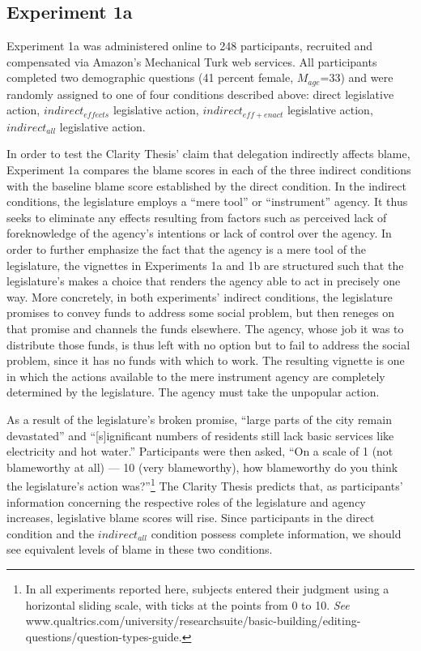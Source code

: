 \documentclass{article}
\begin{document}
\subsection{Experiment 1a}

Experiment 1a was administered online to 248 participants, recruited and compensated via Amazon's Mechanical Turk web services. All participants completed two demographic questions (41 percent female, $M_{age}$=33) and were randomly assigned to one of four conditions described above: direct legislative action, $indirect_{effects}$ legislative action, $indirect_{eff+enact}$ legislative action, $indirect_{all}$ legislative action. 

In order to test the Clarity Thesis' claim that delegation indirectly affects blame, Experiment 1a compares the blame scores in each of the three indirect conditions with the baseline blame score established by the direct condition. In the indirect conditions, the legislature employs a “mere tool” or “instrument” agency.\citep[p. 153]{Kutz2000} It thus seeks to eliminate any effects resulting from factors such as perceived lack of foreknowledge of the agency’s intentions or lack of control over the agency.\citep{Paharia2009} In order to further emphasize the fact that the agency is a mere tool of the legislature, the vignettes in Experiments 1a and 1b are structured such that the legislature's makes a choice that renders the agency able to act in precisely one way. More concretely, in both experiments' indirect conditions, the legislature promises to convey funds to address some social problem, but then reneges on that promise and channels the funds elsewhere. The agency, whose job it was to distribute those funds, is thus left with no option but to fail to address the social problem, since it has no funds with which to work. The resulting vignette is one in which the actions available to the mere instrument agency are completely determined by the legislature. The agency must take the unpopular action. 

As a result of the legislature's broken promise, ``large parts of the city remain devastated'' and ``[s]ignificant numbers of residents still lack basic services like electricity and hot water.'' Participants were then asked, ``On a scale of 1 (not blameworthy at all) --- 10 (very blameworthy), how blameworthy do you think the legislature's action was?''\footnote{In all experiments reported here, subjects entered their judgment using a horizontal sliding scale, with ticks at the points from 0 to 10. \emph{See} www.qualtrics.com/university/researchsuite/basic-building/editing-questions/question-types-guide.} The Clarity Thesis predicts that, as participants' information concerning the respective roles of the legislature and agency increases, legislative blame scores will rise. Since participants in the direct condition and the $indirect_{all}$ condition possess complete information, we should see equivalent levels of blame in these two conditions. 
\end{document}
